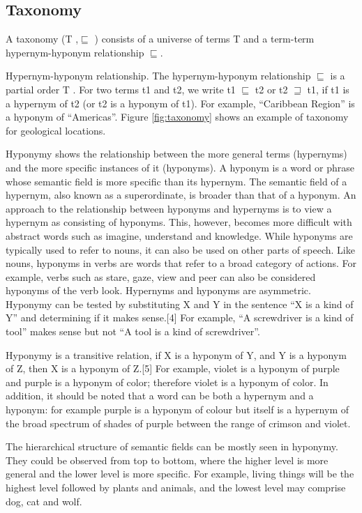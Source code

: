 \documentclass{sig-alternate}
\begin{document}
\subsection{Taxonomy}

A taxonomy (T ,$\sqsubseteq$ ) consists of a universe of terms T and
a term-term hypernym-hyponym relationship $\sqsubseteq$.

Hypernym-hyponym relationship. The hypernym-hyponym relationship
$\sqsubseteq$ is a partial order T . For two terms t1 and t2,
we write t1 $\sqsubseteq$ t2 or t2 $\sqsupseteq$ t1, if t1 is a hypernym of t2 (or t2
is a hyponym of t1). For example, ``Caribbean Region'' is a hyponym of
``Americas''. Figure  \ref{fig:taxonomy} shows an example of taxonomy for geological locations.



Hyponymy shows the relationship between the more general terms (hypernyms) and the more specific instances of it (hyponyms). A hyponym is a word or phrase whose semantic field is more specific than its hypernym. The semantic field of a hypernym, also known as a superordinate, is broader than that of a hyponym. An approach to the relationship between hyponyms and hypernyms is to view a hypernym as consisting of hyponyms. This, however, becomes more difficult with abstract words such as imagine, understand and knowledge. While hyponyms are typically used to refer to nouns, it can also be used on other parts of speech. Like nouns, hyponyms in verbs are words that refer to a broad category of actions. For example, verbs such as stare, gaze, view and peer can also be considered hyponyms of the verb look.
Hypernyms and hyponyms are asymmetric. Hyponymy can be tested by substituting X and Y in the sentence ``X is a kind of Y'' and determining if it makes sense.[4] For example, ``A screwdriver is a kind of tool''  makes sense but not ``A tool is a kind of screwdriver''.


Hyponymy is a transitive relation, if X is a hyponym of Y, and Y is a hyponym of Z, then X is a hyponym of Z.[5] For example, violet is a hyponym of purple and purple is a hyponym of color; therefore violet is a hyponym of color. In addition, it should be noted that a word can be both a hypernym and a hyponym: for example purple is a hyponym of colour but itself is a hypernym of the broad spectrum of shades of purple between the range of crimson and violet.

The hierarchical structure of semantic fields can be mostly seen in hyponymy. They could be observed from top to bottom, where the higher level is more general and the lower level is more specific. For example, living things will be the highest level followed by plants and animals, and the lowest level may comprise dog, cat and wolf.
\end{document}
